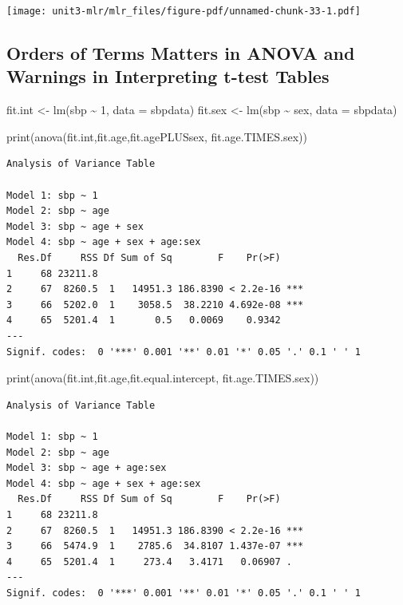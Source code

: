 \documentclass[
  letterpaper,
]{scrbook}
\newenvironment{Shaded}{\begin{snugshade}}{\end{snugshade}}
\newcommand{\AttributeTok}[1]{\textcolor[rgb]{0.40,0.45,0.13}{#1}}
\newcommand{\DecValTok}[1]{\textcolor[rgb]{0.68,0.00,0.00}{#1}}
\newcommand{\FunctionTok}[1]{\textcolor[rgb]{0.28,0.35,0.67}{#1}}
\newcommand{\NormalTok}[1]{\textcolor[rgb]{0.00,0.23,0.31}{#1}}
\newcommand{\OtherTok}[1]{\textcolor[rgb]{0.00,0.23,0.31}{#1}}
\newcommand{\SpecialCharTok}[1]{\textcolor[rgb]{0.37,0.37,0.37}{#1}}
\begin{document}
\texttt{[image: unit3-mlr/mlr\_files/figure-pdf/unnamed-chunk-33-1.pdf]}

\subsection{Orders of Terms Matters in ANOVA and Warnings in
Interpreting t-test
Tables}\label{orders-of-terms-matters-in-anova-and-warnings-in-interpreting-t-test-tables}

\begin{Shaded}
\begin{Highlighting}[]
\NormalTok{fit.int }\OtherTok{\textless{}{-}} \FunctionTok{lm}\NormalTok{(sbp }\SpecialCharTok{\textasciitilde{}} \DecValTok{1}\NormalTok{, }\AttributeTok{data =}\NormalTok{ sbpdata)}
\NormalTok{fit.sex }\OtherTok{\textless{}{-}} \FunctionTok{lm}\NormalTok{(sbp }\SpecialCharTok{\textasciitilde{}}\NormalTok{ sex, }\AttributeTok{data =}\NormalTok{ sbpdata)}

\FunctionTok{print}\NormalTok{(}\FunctionTok{anova}\NormalTok{(fit.int,fit.age,fit.agePLUSsex, fit.age.TIMES.sex))}
\end{Highlighting}
\end{Shaded}

\begin{verbatim}
Analysis of Variance Table

Model 1: sbp ~ 1
Model 2: sbp ~ age
Model 3: sbp ~ age + sex
Model 4: sbp ~ age + sex + age:sex
  Res.Df     RSS Df Sum of Sq        F    Pr(>F)    
1     68 23211.8                                    
2     67  8260.5  1   14951.3 186.8390 < 2.2e-16 ***
3     66  5202.0  1    3058.5  38.2210 4.692e-08 ***
4     65  5201.4  1       0.5   0.0069    0.9342    
---
Signif. codes:  0 '***' 0.001 '**' 0.01 '*' 0.05 '.' 0.1 ' ' 1
\end{verbatim}

\begin{Shaded}
\begin{Highlighting}[]
\FunctionTok{print}\NormalTok{(}\FunctionTok{anova}\NormalTok{(fit.int,fit.age,fit.equal.intercept, fit.age.TIMES.sex))}
\end{Highlighting}
\end{Shaded}

\begin{verbatim}
Analysis of Variance Table

Model 1: sbp ~ 1
Model 2: sbp ~ age
Model 3: sbp ~ age + age:sex
Model 4: sbp ~ age + sex + age:sex
  Res.Df     RSS Df Sum of Sq        F    Pr(>F)    
1     68 23211.8                                    
2     67  8260.5  1   14951.3 186.8390 < 2.2e-16 ***
3     66  5474.9  1    2785.6  34.8107 1.437e-07 ***
4     65  5201.4  1     273.4   3.4171   0.06907 .  
---
Signif. codes:  0 '***' 0.001 '**' 0.01 '*' 0.05 '.' 0.1 ' ' 1
\end{verbatim}
\end{document}
